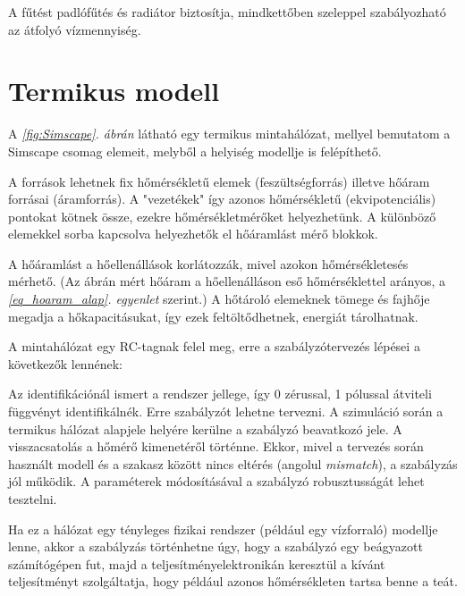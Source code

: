 A fűtést padlófűtés és radiátor biztosítja, mindkettőben szeleppel szabályozható az átfolyó vízmennyiség.

\section{Termikus modell}

A \textit{\ref{fig:Simscape}. ábrán} látható egy termikus mintahálózat, mellyel bemutatom a Simscape csomag elemeit, melyből a helyiség modellje is felépíthető.

A források lehetnek fix hőmérsékletű elemek (feszültségforrás) illetve hőáram forrásai (áramforrás).
A "vezetékek" így azonos hőmérsékletű (ekvipotenciális) pontokat kötnek össze, ezekre hőmérsékletmérőket helyezhetünk. A különböző elemekkel sorba kapcsolva helyezhetők el hőáramlást mérő blokkok.

A hőáramlást a hőellenállások korlátozzák, mivel azokon hőmérsékletesés mérhető. (Az ábrán mért hőáram a hőellenálláson eső hőmérséklettel arányos, a \textit{\ref{eq_hoaram_alap}. egyenlet} szerint.) A hőtároló elemeknek tömege és fajhője megadja a hőkapacitásukat, így ezek feltöltődhetnek, energiát tárolhatnak.


A mintahálózat egy RC-tagnak felel meg, erre a szabályzótervezés lépései a következők lennének:%

Az identifikációnál ismert a rendszer jellege, így 0 zérussal, 1 pólussal átviteli függvényt identifikálnék.
Erre szabályzót lehetne tervezni. A szimuláció során a termikus hálózat alapjele helyére kerülne a szabályzó beavatkozó jele. A visszacsatolás a hőmérő kimenetéről történne. Ekkor, mivel a tervezés során használt modell és a  szakasz között nincs eltérés (angolul \textit{mismatch}), a szabályzás jól működik.
A paraméterek módosításával a szabályzó robusztusságát lehet tesztelni.

Ha ez a hálózat egy tényleges fizikai rendszer (például egy vízforraló) modellje lenne, akkor a szabályzás történhetne úgy, hogy a szabályzó egy beágyazott számítógépen fut, majd a teljesítményelektronikán keresztül a kívánt teljesítményt szolgáltatja, hogy például azonos hőmérsékleten tartsa benne a teát.

